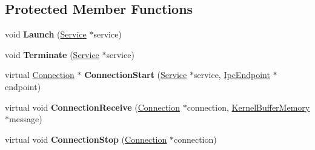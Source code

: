 \subsection*{Protected Member Functions}
\begin{DoxyCompactItemize}
\item 
\mbox{\label{class_provider_driver_aea597c683b195352ea7bddf3f0ba84c4}} 
void {\bfseries Launch} (\hyperlink{class_provider_driver_1_1_service}{Service} $\ast$service)
\item 
\mbox{\label{class_provider_driver_aa51c68dc8ef2410b622e66817dbf954d}} 
void {\bfseries Terminate} (\hyperlink{class_provider_driver_1_1_service}{Service} $\ast$service)
\item 
\mbox{\label{class_provider_driver_a22b99f1b0b0b0478e2578c07c3b5a22c}} 
virtual \hyperlink{class_provider_driver_1_1_connection}{Connection} $\ast$ {\bfseries Connection\+Start} (\hyperlink{class_provider_driver_1_1_service}{Service} $\ast$service, \hyperlink{class_ipc_endpoint}{Ipc\+Endpoint} $\ast$endpoint)
\item 
\mbox{\label{class_provider_driver_ac21796c0194003b4bb7109f86aed5747}} 
virtual void {\bfseries Connection\+Receive} (\hyperlink{class_provider_driver_1_1_connection}{Connection} $\ast$connection, \hyperlink{class_kernel_buffer_memory}{Kernel\+Buffer\+Memory} $\ast$message)
\item 
\mbox{\label{class_provider_driver_a0aacdeb881c7a6100518ffb657459303}} 
virtual void {\bfseries Connection\+Stop} (\hyperlink{class_provider_driver_1_1_connection}{Connection} $\ast$connection)
\end{DoxyCompactItemize}
